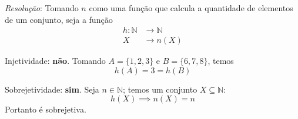 \emph{Resolução}: Tomando $n$ como uma função que calcula a quantidade de elementos de um conjunto, seja a função
\begin{align*}
    h: \mathbb{N} &\rightarrow \mathbb{N} \\
    X &\rightarrow n(X)
\end{align*}
\par Injetividade: \textbf{não}. Tomando $A = \{ 1, 2, 3\}$ e $B = \{6, 7, 8\}$, temos 
    \begin{displaymath}
    h(A) = 3 = h(B)
    \end{displaymath}
\par Sobrejetividade: \textbf{sim}. Seja $n \in \mathbb{N}$; temos um conjunto $X \subseteq \mathbb{N}$:
    \begin{displaymath}
        h(X) \implies n(X) = n
    \end{displaymath}
Portanto é sobrejetiva.